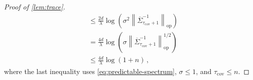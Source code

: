 \documentclass[11pt]{article}
\newcommand{\op}{\mathrm{op}}
\newcommand{\1}{\mathbf 1}
\newcommand{\norm}[1]{\left\lVert #1\right\rVert}
\begin{document}
\begin{proof}[Proof of \cref{lem:trace}]
\begin{align}
         & \leq
        \frac{2d}{\lambda}
        \log\left(
        \sigma^2
        \norm{\overline\Sigma_{\tau_{\mathrm{cov}}+1}^{-1}}_{\op}
        \right)                        \\
         & =
        \frac{4d}{\lambda}
        \log\left(
        \sigma
        \norm{\overline\Sigma_{\tau_{\mathrm{cov}}+1}^{-1}}_{\op}^{1/2}
        \right)                        \\
         & \leq
        \frac{4d}{\lambda}
        \log\left(1+n\right)\,,
    \end{align}
    where the last inequality
    uses \eqref{eq:predictable-spectrum},
    $\sigma\leq1$, and $\tau_{\mathrm{cov}}\leq n$.
\end{proof}
\end{document}
